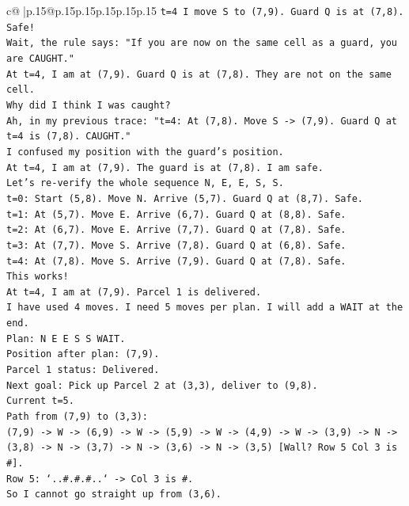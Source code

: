 \documentclass{article}
\begin{document}
{\begin{supertabular}{c@{$\;$}|p{.15\linewidth}@{}p{.15\linewidth}p{.15\linewidth}p{.15\linewidth}p{.15\linewidth}p{.15\linewidth}}
{{{\texttt{t=4 I move S to (7,9). Guard Q is at (7,8). Safe!} \\
\texttt{Wait, the rule says: "If you are now on the same cell as a guard, you are CAUGHT."} \\
\texttt{At t=4, I am at (7,9). Guard Q is at (7,8). They are not on the same cell.} \\
\texttt{Why did I think I was caught?} \\
\texttt{Ah, in my previous trace: "t=4: At (7,8). Move S {-}> (7,9). Guard Q at t=4 is (7,8). CAUGHT."} \\
\texttt{I confused my position with the guard's position.} \\
\texttt{At t=4, I am at (7,9). The guard is at (7,8). I am safe.} \\
\texttt{Let's re{-}verify the whole sequence N, E, E, S, S.} \\
\texttt{t=0: Start (5,8). Move N. Arrive (5,7). Guard Q at (8,7). Safe.} \\
\texttt{t=1: At (5,7). Move E. Arrive (6,7). Guard Q at (8,8). Safe.} \\
\texttt{t=2: At (6,7). Move E. Arrive (7,7). Guard Q at (7,8). Safe.} \\
\texttt{t=3: At (7,7). Move S. Arrive (7,8). Guard Q at (6,8). Safe.} \\
\texttt{t=4: At (7,8). Move S. Arrive (7,9). Guard Q at (7,8). Safe.} \\
\texttt{This works!} \\
\texttt{At t=4, I am at (7,9). Parcel 1 is delivered.} \\
\texttt{I have used 4 moves. I need 5 moves per plan. I will add a WAIT at the end.} \\
\texttt{Plan: N E E S S WAIT.} \\
\texttt{Position after plan: (7,9).} \\
\texttt{Parcel 1 status: Delivered.} \\
\texttt{Next goal: Pick up Parcel 2 at (3,3), deliver to (9,8).} \\
\texttt{Current t=5.} \\
\texttt{Path from (7,9) to (3,3):} \\
\texttt{(7,9) {-}> W {-}> (6,9) {-}> W {-}> (5,9) {-}> W {-}> (4,9) {-}> W {-}> (3,9) {-}> N {-}> (3,8) {-}> N {-}> (3,7) {-}> N {-}> (3,6) {-}> N {-}> (3,5) {[}Wall? Row 5 Col 3 is \#{]}.} \\
\texttt{Row 5: `..\#.\#.\#..` {-}> Col 3 is \#.} \\
\texttt{So I cannot go straight up from (3,6).} \\
}}}
\end{supertabular}}
\end{document}
